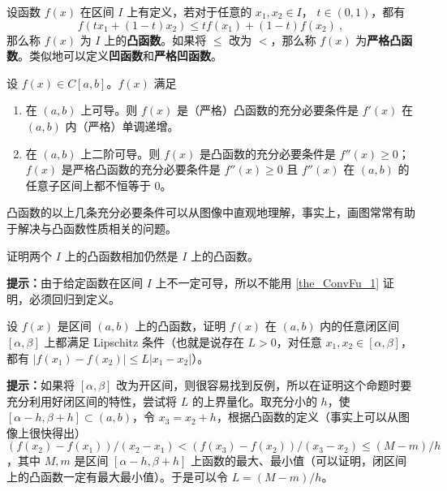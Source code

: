 

设函数 $f(x)$ 在区间 $I$ 上有定义，若对于任意的 $x_1,x_2\in I$， $t\in (0,1)$，都有
\begin{equation}
f(tx_1+(1-t)x_2)\le tf(x_1)+(1-t)f(x_2)~,
\end{equation}
那么称 $f(x)$ 为 $I$ 上的\textbf{凸函数}。如果将 $\le$ 改为 $<$，那么称 $f(x)$ 为\textbf{严格凸函数}。类似地可以定义\textbf{凹函数}和\textbf{严格凹函数}。
\begin{theorem}{}\label{the_ConvFu_1}
设 $f(x)\in C[a,b]$。$f(x)$ 满足
\begin{enumerate}
\item 在 $(a,b)$ 上可导。则 $f(x)$ 是（严格）凸函数的充分必要条件是 $f'(x)$ 在 $(a,b)$ 内（严格）单调递增。
\item 在 $(a,b)$ 上二阶可导。则 $f(x)$ 是凸函数的充分必要条件是 $f''(x)\ge 0$；$f(x)$ 是严格凸函数的充分必要条件是 $f''(x)\ge 0$ 且 $f''(x)$ 在 $(a,b)$ 的任意子区间上都不恒等于 $0$。
\end{enumerate}
\end{theorem}
凸函数的以上几条充分必要条件可以从图像中直观地理解，事实上，画图常常有助于解决与凸函数性质相关的问题。
\begin{exercise}{}
证明两个 $I$ 上的凸函数相加仍然是 $I$ 上的凸函数。

\textbf{提示：}由于给定函数在区间 $I$ 上不一定可导，所以不能用  
\autoref{the_ConvFu_1} 证明，必须回归到定义。
\end{exercise}
\begin{exercise}{}
设 $f(x)$ 是区间 $(a,b)$ 上的凸函数，证明 $f(x)$ 在 $(a,b)$ 内的任意闭区间 $[\alpha,\beta]$ 上都满足 Lipschitz 条件（也就是说存在 $L>0$，对任意 $x_1,x_2\in [\alpha,\beta]$，都有 $|f(x_1)-f(x_2)|\le L|x_1-x_2|$）。

\textbf{提示：}如果将 $[\alpha,\beta]$ 改为开区间，则很容易找到反例，所以在证明这个命题时要充分利用好闭区间的特性，尝试将 $L$ 的上界量化。取充分小的 $h$，使 $[\alpha-h,\beta+h]\subset (a,b)$，令 $x_3=x_2+h$，根据凸函数的定义（事实上可以从图像上很快得出）$(f(x_2)-f(x_1))/(x_2-x_1)<(f(x_3)-f(x_2))/(x_3-x_2)\le (M-m)/h$，其中 $M,m$ 是区间 $[\alpha-h,\beta+h]$ 上函数的最大、最小值（可以证明，闭区间上的凸函数一定有最大最小值）。于是可以令 $L=(M-m)/h$。
\end{exercise}


